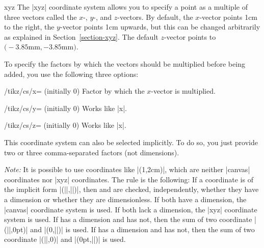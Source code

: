 \begin{coordinatesystem}{xyz}
  The |xyz| coordinate system allows you to specify a point as a
  multiple of three vectors called the $x$-, $y$-, and
  $z$-vectors.  By default, the $x$-vector points 1cm to the right,
  the $y$-vector points 1cm upwards, but this can be changed
  arbitrarily as explained in Section~\ref{section-xyz}. The default
  $z$-vector points to $\bigl(-3.85\textrm{mm},-3.85\textrm{mm}\bigr)$.

  To specify the factors by which the vectors should be multiplied
  before being added, you use the following three options:
  \begin{key}{/tikz/cs/x= (initially 0)}
    Factor by which the $x$-vector is multiplied.
  \end{key}
  \begin{key}{/tikz/cs/y= (initially 0)}
    Works like |x|.
  \end{key}
  \begin{key}{/tikz/cs/z= (initially 0)}
    Works like |x|.
  \end{key}

\begin{codeexample}[]
\end{codeexample}

  This coordinate system can also be selected implicitly. To do so,
  you just provide two or three comma-separated factors (not
  dimensions).
\begin{codeexample}[]
\end{codeexample}
\end{coordinatesystem}

\emph{Note:} It is possible to use coordinates like |(1,2cm)|, which
are neither |canvas| coordinates nor |xyz| coordinates. The rule is
the following: If a coordinate is of the implicit form
|(||,||)|, then  and  are checked,
independently, whether they have a dimension or whether they are
dimensionless. If both have a dimension, the |canvas| coordinate
system is used. If both lack a dimension, the |xyz| coordinate system
is used. If  has a dimension and  has not, then the
sum of two coordinate |(||,0pt)| and |(0,||)| is
used. If  has a dimension and  has not, then the sum
of two coordinate |(||,0)| and |(0pt,||)| is used.

